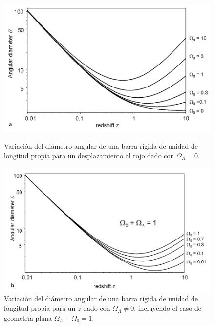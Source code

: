 \documentclass[11pt]{article}
\begin{document}
    
    
    
    
    
    
    \begin{figure}[H]
        \begin{minipage}[b]{0.42\linewidth}
        \centering
            \includegraphics[scale=0.40]{angular_diameter78a_pp235Malcolm.png}
            \caption{\footnotesize{Variación del diámetro angular de una barra rígida de unidad de longitud propia para un desplazamiento al rojo dado con $\Omega_{\Lambda}=0$.}}
    \end{minipage}
        \hspace{0.5cm}
    \begin{minipage}[b]{0.45\linewidth}
        \centering
            \includegraphics[scale=0.40]{angular_diameter78b_pp235Malcolm.png}
            
            \caption{\footnotesize{Variación del diámetro angular de una barra rígida de unidad de longitud propia para un $z$ dado con $\Omega_{\Lambda} \neq 0$, incluyendo el caso de geometría plana $\Omega_{\Lambda} + \Omega_0 =1$. }}
    \end{minipage}
\end{figure}
    
\end{document}
